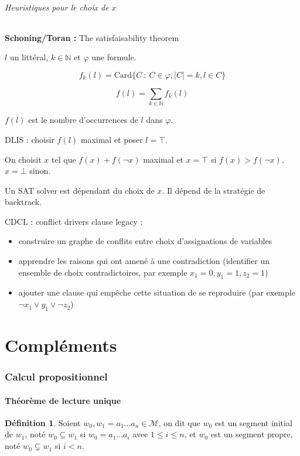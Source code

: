 \documentclass[]{article}
\theoremstyle{remark}
\theoremstyle{definition}
\newtheorem{mydef}{Définition}
\begin{document}
\paragraph{Heuristiques pour le choix de $x$}

\leavevmode

\textbf{Schoning/Toran :} The satisfaisability theorem

$l$ un littéral, $k \in \mathbb{N}$ et $\varphi$ une formule.

$$f_k(l) = \text{Card}\{C ~ : ~ C \in \varphi, |C| = k, l \in C\}$$

$$f(l) = \sum_{k \in \mathbb{N}} f_k(l)$$

$f(l)$ est le nombre d'occurrences de $l$ dans $\varphi$.

DLIS : choisir $f(l)$ maximal et poser $l = \top$.

On choisit $x$ tel que $f(x) + f(\neg x)$ maximal et $x=\top$ si $f(x) > f(\neg x)$, $x = \bot$ sinon.

Un SAT solver est dépendant du choix de $x$. Il dépend de la stratégie de backtrack.

CDCL : conflict drivers clause legacy :
\begin{itemize}
	\item construire un graphe de conflits entre choix d'assignations de variables
	\item apprendre les raisons qui ont amené à une contradiction (identifier un ensemble de choix contradictoires, par exemple $x_1 = 0, y_1 = 1, z_2 = 1$)
	\item ajouter une clause qui empêche cette situation de se reproduire (par exemple $\neg x_1 \lor y_1 \lor \neg z_2$)
\end{itemize}

\part{Compléments}
\section{Calcul propositionnel}

\subsection{Théorème de lecture unique}

\begin{mydef}
	Soient $w_0, w_1=a_1...a_n \in \mathcal{M}$, on dit que $w_0$ est un segment initial de $w_1$, noté $w_0 \subseteq w_1$ si $w_0=a_1...a_i$ avec $1 \leqslant i \leqslant n$, et $w_0$ est un segment propre, noté $w_0 \subsetneq w_1$ si $i < n$.
\end{mydef}
\end{document}
